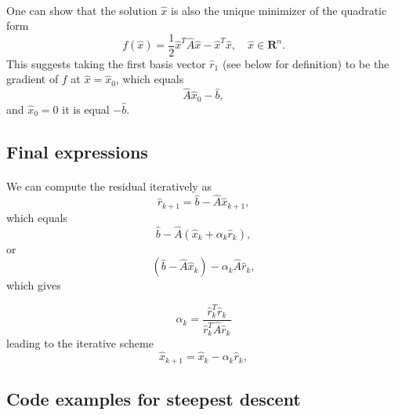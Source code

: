 \documentclass[%
oneside,                 %
final,                   %
10pt]{article}
\begin{document}
\paragraph{}
One can show that the solution $\hat{x}$ is also the unique minimizer of the quadratic form
\begin{equation*}
  f(\hat{x}) = \frac{1}{2}\hat{x}^T\hat{A}\hat{x} - \hat{x}^T \hat{x} , \quad \hat{x}\in\mathbf{R}^n. 
\end{equation*}
This suggests taking the first basis vector $\hat{r}_1$ (see below for definition) 
to be the gradient of $f$ at $\hat{x}=\hat{x}_0$, 
which equals
\begin{equation*}
\hat{A}\hat{x}_0-\hat{b},
\end{equation*}
and 
$\hat{x}_0=0$ it is equal $-\hat{b}$.



\subsection*{Final expressions}

\paragraph{}
We can compute the residual iteratively as
\begin{equation*}
\hat{r}_{k+1}=\hat{b}-\hat{A}\hat{x}_{k+1},
 \end{equation*}
which equals
\begin{equation*}
\hat{b}-\hat{A}(\hat{x}_k+\alpha_k\hat{r}_k),
 \end{equation*}
or
\begin{equation*}
(\hat{b}-\hat{A}\hat{x}_k)-\alpha_k\hat{A}\hat{r}_k,
 \end{equation*}
which gives

\[
\alpha_k = \frac{\hat{r}_k^T\hat{r}_k}{\hat{r}_k^T\hat{A}\hat{r}_k}
\]
leading to the iterative scheme
\begin{equation*}
\hat{x}_{k+1}=\hat{x}_k-\alpha_k\hat{r}_{k},
 \end{equation*}




\subsection*{Code examples for steepest descent}
\end{document}
